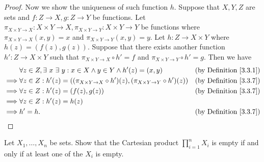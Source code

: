 \begin{proof}
    Now we show the uniqueness of such function \(h\).
    Suppose that \(X, Y, Z\) are sets and \(f : Z \to X, g : Z \to Y\) be functions.
    Let \(\pi_{X \times Y \to X} : X \times Y \to X, \pi_{X \times Y \to Y} : X \times Y \to Y\) be functions where \(\pi_{X \times Y \to X}(x, y) = x\) and \(\pi_{X \times Y \to Y}(x, y) = y\).
    Let \(h : Z \to X \times Y\) where \(h(z) = (f(z), g(z))\).
    Suppose that there exists another function \(h' : Z \to X \times Y\) such that \(\pi_{X \times Y \to X} \circ h' = f\) and \(\pi_{X \times Y \to Y} \circ h' = g\).
    Then we have
    \begin{align*}
                 & \forall z \in Z, \exists\ x \ \exists\ y : x \in X \land y \in Y \land h'(z) = (x, y)                  & \text{(by Definition \ref{3.3.1})} \\
        \implies & \forall z \in Z : h'(z) = ((\pi_{X \times Y \to X} \circ h')(z), (\pi_{X \times Y \to Y} \circ h')(z)) & \text{(by Definition \ref{3.3.7})} \\
        \implies & \forall z \in Z : h'(z) = (f(z), g(z))                                                                 & \text{(by Definition \ref{3.3.7})} \\
        \implies & \forall z \in Z : h'(z) = h(z)                                                                                                              \\
        \implies & h' = h.                                                                                                & \text{(by Definition \ref{3.3.7})}
    \end{align*}
\end{proof}

\begin{exercise}\label{ex 3.5.8}
    Let \(X_1, \dots, X_n\) be sets.
    Show that the Cartesian product \(\prod_{i = 1}^n X_i\) is empty if and only if at least one of the \(X_i\) is empty.
\end{exercise}

